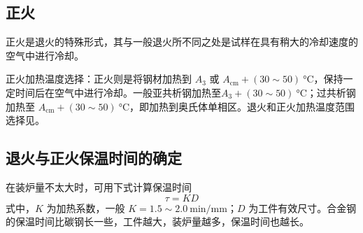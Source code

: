     \subsection{正火}
        正火是退火的特殊形式，其与一般退火所不同之处是试样在具有稍大的冷却速度的空气中进行冷却。\par
        正火加热温度选择：正火则是将钢材加热到 $A_3$ 或 $A_{\textrm{cm}} + (30 \sim 50)~\unit{\degreeCelsius}$，保持一定时间后在空气中进行冷却。一般亚共析钢加热至$A_3 + (30 \sim 50)~\unit{\degreeCelsius}$；过共析钢加热至 $A_{\textrm{cm}} + (30 \sim 50)~\unit{\degreeCelsius}$，即加热到奥氏体单相区。退火和正火加热温度范围选择见。
        \begin{figure}[!ht]
        \begin{floatrow}\centering
        \end{floatrow}
        \end{figure}
    \subsection{退火与正火保温时间的确定}
        在装炉量不太大时，可用下式计算保温时间
        \begin{equation}
            \tau = K D \label{equ:A3.1}
        \end{equation}
        式中，$K$ 为加热系数，一般 $K=1.5 \sim \SI{2.0}{\minute/\milli\metre}$；$D$ 为工件有效尺寸。合金钢的保温时间比碳钢长一些，工件越大，装炉量越多，保温时间也越长。
